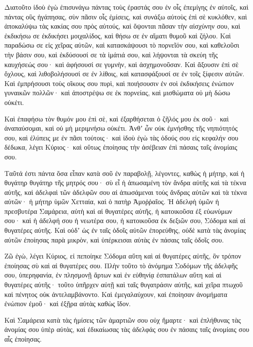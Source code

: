 {Διατοῦτο ἰδοὺ ἐγὼ ἐπισυνάγω πάντας τοὺς ἐραστάς σου ἐν οἷς ἐπεμίγης ἐν αὐτοῖς, καὶ πάντας οὓς ἠγάπησας, σὺν πᾶσιν οἷς ἐμίσεις, καὶ συνάξω αὐτοὺς ἐπὶ σὲ κυκλόθεν, καὶ ἀποκαλύψω τὰς κακίας σου πρὸς αὐτούς, καὶ ὄψονται πᾶσαν τὴν αἰσχύνην σου,
καὶ ἐκδικήσω σε ἐκδικήσει μοιχαλίδος, καὶ θήσω σε ἐν αἵματι θυμοῦ καὶ ζήλου.
Καὶ παραδώσω σε εἰς χεῖρας αὐτῶν, καὶ κατασκάψουσι τὸ πορνεῖόν σου, καὶ καθελοῦσι τὴν βάσιν σου, καὶ ἐκδύσουσί σε τὰ ἱμάτιά σου, καὶ λήψονται τὰ σκεύη τῆς καυχήσεώς σου· καὶ ἀφήσουσί σε γυμνὴν, καὶ ἀσχημονοῦσαν.
Καὶ ἄξουσιν ἐπὶ σὲ ὄχλους, καὶ λιθοβολήσουσί σε ἐν λίθοις, καὶ κατασφάξουσί σε ἐν τοῖς ξίφεσιν αὐτῶν.
Καὶ ἐμπρήσουσι τοὺς οἴκους σου πυρὶ, καὶ ποιήσουσιν ἐν σοὶ ἐκδικήσεις ἐνώπιον γυναικῶν πολλῶν· καὶ ἀποστρέψω σε ἐκ πορνείας, καὶ μισθώματα οὐ μὴ δώσω οὐκέτι.
\par }{\PP {}Καὶ ἐπαφήσω τὸν θυμόν μου ἐπὶ σὲ, καὶ ἐξαρθήσεται ὁ ζῆλός μου ἐκ σοῦ· καὶ ἀναπαύσομαι, καὶ οὐ μὴ μεριμνήσω οὐκέτι.
Ἀνθʼ ὧν οὐκ ἐμνήσθης τῆς νηπιότητός σου, καὶ ἐλύπεις με ἐν πᾶσι τούτοις· καὶ ἰδοὺ ἐγὼ τὰς ὁδούς σου εἰς κεφαλήν σου δέδωκα, λέγει Κύριος· καὶ οὕτως ἐποίησας τὴν ἀσέβειαν ἐπὶ πάσαις ταῖς ἀνομίαις σου.
\par }{\PP {}Ταῦτά ἐστι πάντα ὅσα εἶπαν κατὰ σοῦ ἐν παραβολῇ, λέγοντες, καθὼς ἡ μήτηρ,
καὶ ἡ θυγάτηρ θυγάτηρ τῆς μητρός σου· σὺ εἶ ἡ ἀπωσαμένη τὸν ἄνδρα αὐτῆς καὶ τὰ τέκνα αὐτῆς, καὶ ἀδελφαὶ τῶν ἀδελφῶν σου αἱ ἀπωσάμεναι τοὺς ἄνδρας αὐτῶν καὶ τὰ τέκνα αὐτῶν· ἡ μήτηρ ὑμῶν Χετταία, καὶ ὁ πατὴρ Ἀμοῤῥαῖος.
Ἡ ἀδελφὴ ὑμῶν ἡ πρεσβυτέρα Σαμάρεια, αὐτὴ καὶ αἱ θυγατέρες αὐτῆς, ἡ κατοικοῦσα ἐξ εὐωνύμων σου· καὶ ἡ ἀδελφή σου ἡ νεωτέρα σου, ἡ κατοικοῦσα ἐκ δεξιῶν σου, Σόδομα καὶ αἱ θυγατέρες αὐτῆς.
Καὶ οὐδʼ ὡς ἐν ταῖς ὁδοῖς αὐτῶν ἐπορεύθης, οὐδὲ κατὰ τὰς ἀνομίας αὐτῶν ἐποίησας παρὰ μικρὸν, καὶ ὑπέρκεισαι αὐτὰς ἐν πάσαις ταῖς ὁδοῖς σου.
\par }{\PP {}Ζῶ ἐγὼ, λέγει Κύριος, εἰ πεποίηκε Σόδομα αὕτη καὶ αἱ θυγατέρες αὐτῆς, ὃν τρόπον ἐποίησας σὺ καὶ αἱ θυγατέρες σου.
Πλὴν τοῦτο τὸ ἀνόμημα Σοδόμων τῆς ἀδελφῆς σου, ὑπερηφανία, ἐν πλησμονῇ ἄρτων καὶ ἐν εὐθηνίᾳ ἐσπατάλων αὕτη καὶ αἱ θυγατέρες αὐτῆς· τοῦτο ὑπῆρχεν αὐτῇ καὶ ταῖς θυγατράσιν αὐτῆς, καὶ χεῖρα πτωχοῦ καὶ πένητος οὐκ ἀντελαμβάνοντο.
Καὶ ἐμεγαλαύχουν, καὶ ἐποίησαν ἀνομήματα ἐνώπιον ἐμοῦ· καὶ ἐξῇρα αὐτὰς καθὼς ἴδον.
\par }{\PP {}Καὶ Σαμάρεια κατὰ τὰς ἡμίσεις τῶν ἁμαρτιῶν σου οὐχ ἥμαρτε· καὶ ἐπλήθυνας τὰς ἀνομίας σου ὑπὲρ αὐτὰς, καὶ ἐδικαίωσας τὰς ἀδελφάς σου ἐν πάσαις ταῖς ἀνομίαις σου αἷς ἐποίησας.
}
